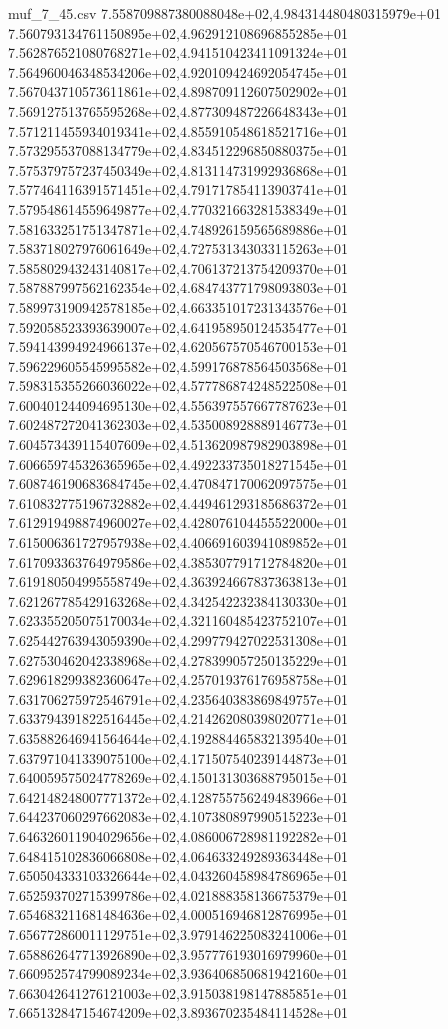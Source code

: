 \begin{filecontents*}{muf_7_45.csv}
7.558709887380088048e+02,4.984314480480315979e+01
7.560793134761150895e+02,4.962912108696855285e+01
7.562876521080768271e+02,4.941510423411091324e+01
7.564960046348534206e+02,4.920109424692054745e+01
7.567043710573611861e+02,4.898709112607502902e+01
7.569127513765595268e+02,4.877309487226648343e+01
7.571211455934019341e+02,4.855910548618521716e+01
7.573295537088134779e+02,4.834512296850880375e+01
7.575379757237450349e+02,4.813114731992936868e+01
7.577464116391571451e+02,4.791717854113903741e+01
7.579548614559649877e+02,4.770321663281538349e+01
7.581633251751347871e+02,4.748926159565689886e+01
7.583718027976061649e+02,4.727531343033115263e+01
7.585802943243140817e+02,4.706137213754209370e+01
7.587887997562162354e+02,4.684743771798093803e+01
7.589973190942578185e+02,4.663351017231343576e+01
7.592058523393639007e+02,4.641958950124535477e+01
7.594143994924966137e+02,4.620567570546700153e+01
7.596229605545995582e+02,4.599176878564503568e+01
7.598315355266036022e+02,4.577786874248522508e+01
7.600401244094695130e+02,4.556397557667787623e+01
7.602487272041362303e+02,4.535008928889146773e+01
7.604573439115407609e+02,4.513620987982903898e+01
7.606659745326365965e+02,4.492233735018271545e+01
7.608746190683684745e+02,4.470847170062097575e+01
7.610832775196732882e+02,4.449461293185686372e+01
7.612919498874960027e+02,4.428076104455522000e+01
7.615006361727957938e+02,4.406691603941089852e+01
7.617093363764979586e+02,4.385307791712784820e+01
7.619180504995558749e+02,4.363924667837363813e+01
7.621267785429163268e+02,4.342542232384130330e+01
7.623355205075170034e+02,4.321160485423752107e+01
7.625442763943059390e+02,4.299779427022531308e+01
7.627530462042338968e+02,4.278399057250135229e+01
7.629618299382360647e+02,4.257019376176958758e+01
7.631706275972546791e+02,4.235640383869849757e+01
7.633794391822516445e+02,4.214262080398020771e+01
7.635882646941564644e+02,4.192884465832139540e+01
7.637971041339075100e+02,4.171507540239144873e+01
7.640059575024778269e+02,4.150131303688795015e+01
7.642148248007771372e+02,4.128755756249483966e+01
7.644237060297662083e+02,4.107380897990515223e+01
7.646326011904029656e+02,4.086006728981192282e+01
7.648415102836066808e+02,4.064633249289363448e+01
7.650504333103326644e+02,4.043260458984786965e+01
7.652593702715399786e+02,4.021888358136675379e+01
7.654683211681484636e+02,4.000516946812876995e+01
7.656772860011129751e+02,3.979146225083241006e+01
7.658862647713926890e+02,3.957776193016979960e+01
7.660952574799089234e+02,3.936406850681942160e+01
7.663042641276121003e+02,3.915038198147885851e+01
7.665132847154674209e+02,3.893670235484114528e+01

\end{filecontents*}
